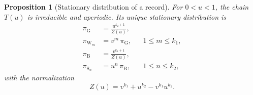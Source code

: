 \documentclass[10pt]{wlscirep}
\newcommand{\st}[1]{\mathrm{#1}}           %
\theoremstyle{plain}
\newtheorem{proposition}[lemma]{Proposition}
\theoremstyle{remark}
\begin{document}
\begin{proposition}[Stationary distribution of a record]\label{prop:stationary}
For $0<u<1$, the chain $T(u)$ is irreducible and aperiodic. Its unique stationary distribution is
\begin{equation}
\begin{aligned}
\pi_{\st G}&=\frac{u^{k_2+1}}{Z(u)},\\[2pt]
\pi_{\st W_m}&=v^{m}\,\pi_{\st G}, && 1\leq m\leq k_1,\\[2pt]
\pi_{\st B}&=\frac{v^{k_1+1}}{Z(u)},\\[2pt]
\pi_{\st S_n}&=u^{n}\,\pi_{\st B}, && 1\leq n\leq k_2,
\end{aligned}
\label{eq:s-stationary}
\end{equation}
with the normalization
\begin{equation}
Z(u)=v^{k_1}+u^{k_2}-v^{k_1}u^{k_2}.
\label{eq:s-Z}
\end{equation}
\end{proposition}
\end{document}

